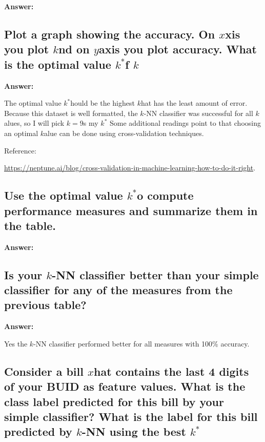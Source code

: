 \documentclass[12pt, a4paper]{extarticle}
\newcommand{\answer}[1]{\textbf{Answer: }\par#1}
\newcommand{\knn}{\texorpdfstring{$k$-NN}}
\newcommand{\var}[1]{\texorpdfstring{#1}\xspace}
\begin{document}
    \answer{}

    \subsection{Plot a graph showing the accuracy. On \var{$x$} axis you plot \var{$k$} and on \var{$y$}-axis you plot accuracy. What is the optimal value \var{$k^*$} of \var{$k$}?} \label{subsec:question3.2}

    \answer{}
    
    The optimal value \var{$k^*$} should be the highest \var{$k$} that has the least amount of error.
    Because this dataset is well formatted, the \knn{} classifier was successful for all \var{$k$} values, so I will pick \var{$k=9$} as my \var{$k^*$}.
    Some additional readings point to that choosing an optimal \var{$k$} value can be done using cross-validation techniques.
    
    Reference: \par
    \url{https://neptune.ai/blog/cross-validation-in-machine-learning-how-to-do-it-right}. 

    \subsection{Use the optimal value \var{$k^*$} to compute performance measures and summarize them in the table.} \label{subsec:question3.3}

    \answer{}

    \subsection{Is your \knn{} classifier better than your simple classifier for any of the measures from the previous table?} \label{subsec:question3.4}

    \answer{Yes the \knn{} classifier performed better for all measures with 100\% accuracy.}

    \subsection{Consider a bill \var{$x$} that contains the last 4 digits of your BUID as feature values. What is the class label predicted for this bill by your simple classifier? What is the label for this bill predicted by \knn{} using the best \var{$k^*$}?} \label{subsec:question3.5}
\end{document}
